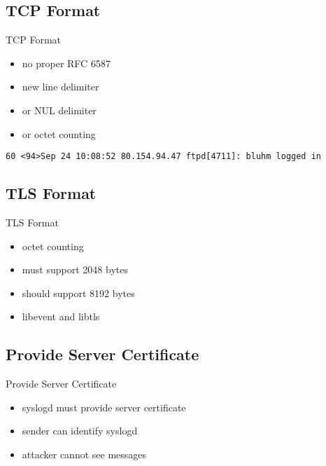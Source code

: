 \documentclass[14pt]{beamer}
\begin{document}
\subsection{TCP Format}
\begin{frame}{TCP Format}
\begin{itemize}
    \item no proper RFC 6587
    \item new line delimiter
    \item or NUL delimiter
    \item or octet counting
\end{itemize}
    \texttt{60 <94>Sep 24 10:08:52 80.154.94.47 ftpd[4711]:\ bluhm logged in}
\end{frame}

\subsection{TLS Format}
\begin{frame}{TLS Format}
\begin{itemize}
    \item octet counting
    \item must support 2048 bytes
    \item should support 8192 bytes
    \item libevent and libtls
\end{itemize}
\end{frame}

\subsection{Provide Server Certificate}
\begin{frame}{Provide Server Certificate}
\begin{itemize}
    \item syslogd must provide server certificate
    \item sender can identify syslogd
    \item attacker cannot see messages
\end{itemize}
\end{frame}
\end{document}

